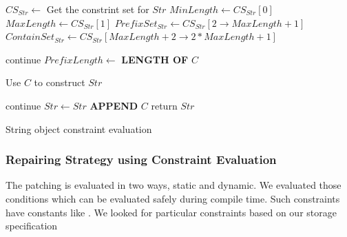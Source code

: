 \begin{algorithm}
\scriptsize
\DontPrintSemicolon
{}
\Begin
{
 $CS_{Str} \longleftarrow$ Get the constrint set for $Str$\;
 $MinLength \longleftarrow CS_{Str}[0]$\;
 $MaxLength \longleftarrow CS_{Str}[1]$\;
 $PrefixSet_{Str} \longleftarrow CS_{Str}[2 \rightarrow MaxLength + 1]$\;
 $ContainSet_{Str} \longleftarrow CS_{Str}[MaxLength +2  \rightarrow 2*MaxLength
 + 1]$\;
 
  {
   {
    continue\;
   }
   $PrefixLength \longleftarrow$ {\bf LENGTH OF} $C$\;
   
   {
     Use $C$ to construct $Str$\;
   }
  }
 
  {
   {
    continue\;
   }
   $Str \leftarrow Str$ {\bf APPEND} $C$\;
  }
  return $Str$\;
}
\caption{String object constraint evaluation}
 \label{algo:constraint}
\end{algorithm}

\subsubsection{Repairing Strategy using Constraint Evaluation}
\label{subsubsec:repairingStrategyConstraint}

The patching is evaluated in two ways, static and dynamic. We evaluated those
conditions which can be evaluated safely during compile time. Such constraints
have constants like . We looked for particular
constraints based on our storage specification 
